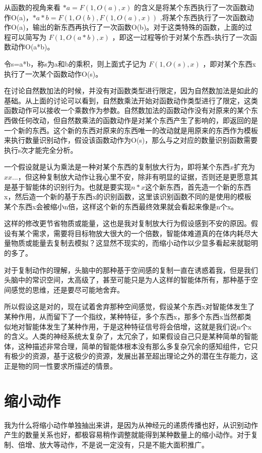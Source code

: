 \documentclass[12pt,oneside]{book}
\begin{document}
从函数的视角来看 $*a = F(1, O(a), x)$ 的含义是将某个东西执行了一次函数动作O(a)，$*a*b = F(1, O(b), F(1, O(a), x))$ ,将某个东西执行了一次函数动作O(a)，输出的新东西再执行了一次函数O(b)。对于这类特殊的函数，上面的过程可以简写为 $F(1, O(a*b), x)$ ，即这一过程等价于对某个东西x执行了一次函数动作O(a*b)。

令s=a*b，称s为a和b的乘积，则上面式子记为 $F(1, O(s), x)$ ，即对某个东西x执行了一次某个函数动作O(s)。

在讨论自然数加法的时候，并没有对函数类型进行限定，因为自然数加法是如此的基础。从上面的讨论可以看到，自然数乘法开始对函数动作类型进行了限定，这类函数动作可以接收一个乘数作为参数。自然数加法的函数动作没有对原来的某个东西做任何改动，但自然数乘法的函数动作是对某个东西产生了影响的，即返回的是一个新的东西。这个新的东西对原来的东西唯一的改动就是用原来的东西作为模板来执行数量识别动作，假设该函数动作为O(s)，那么与之对应的数量识别函数需要执行s次才能完全分析。

一个假设就是认为乘法是一种对某个东西的复制放大行为，即将某个东西$x$扩充为 $x x ...$，但这种复制放大动作让我心里不安，除非有明显的证据，否则还是更愿意其是基于智能体的识别行为。也就是要实现$n*x$这个新东西，首先造一个新的东西x，然后造一个新的基于东西x的识别函数，这里该识别函数不同的是使用的模板某个东西x会被缩小n倍，这样这个新的东西最终效果就会看起来像是n个x。

这样的修改更节省物质或能量，这也是我对复制放大行为假设感到不安的原因。假设有某个需求，需要将目标物放大很大的一个倍数，智能体难道真的在体内耗尽大量物质或能量去复制去模拟？这显然不现实的，而缩小动作以少显多看起来就聪明的多了。

对于复制动作的理解，头脑中的那种基于空间感的复制一直在诱惑着我，但是我们头脑中的常识空间，太高级了，甚至可能只是为人这样的智能体所有，那种基于空间感觉的思维，还是要尽可能地舍弃。

所以假设这是对的，现在试着舍弃那种空间感觉，假设某个东西x对智能体发生了某种作用，从而留下了一个指纹，某种特征，多个东西x，那多个东西x当然都类似地对智能体发生了某种作用，于是这种特征信号将会倍增，这就是我们说n个x的含义。人类的神经系统太复杂了，太冗余了，如果假设自己只是某种简单的智能体，这种描述非常合理，简单的智能体根本没有那么多复杂冗余的感知组件，它只有极少的资源，基于这极少的资源，发展出甚至超出理论之外的潜在生存能力，这正是物的同一性要求所描述的情景。



\section{缩小动作}
我为什么将缩小动作单独抽出来讲，是因为从神经元的递质传播也好，从识别动作产生的数量关系也好，都极容易稍作调整就能得到某种数量上的缩小动作。对于复制、倍增、放大等动作，不是说一定没有，只是不能大面积推广。
\end{document}
